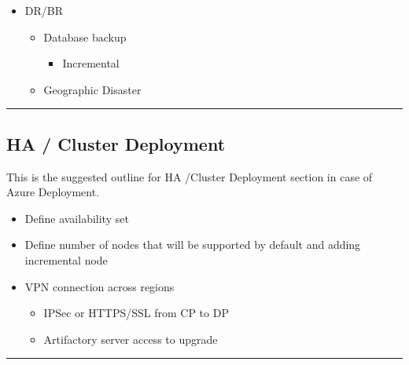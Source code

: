 \documentclass[letterpaper,10pt,english]{sphinxmanual}
\begin{document}
\begin{enumerate}
\begin{itemize}
\item {} 
DR/BR
\begin{itemize}
\item {} 
Database backup
\begin{itemize}
\item {} 
Incremental

\end{itemize}

\item {} 
Geographic Disaster

\end{itemize}

\end{itemize}

\end{enumerate}


\bigskip\hrule\bigskip



\subsection{HA / Cluster Deployment}
\label{\detokenize{loom_installation_guide:ha-cluster-deployment}}
This is the suggested outline for HA /Cluster Deployment section in case of Azure Deployment.
\begin{itemize}
\item {} 
Define availability set

\item {} 
Define number of nodes that will be supported by default and adding incremental node

\item {} 
VPN connection across regions
\begin{itemize}
\item {} 
IPSec or HTTPS/SSL from CP to DP

\item {} 
Artifactory server access to upgrade

\end{itemize}

\end{itemize}


\bigskip\hrule\bigskip
\end{document}
